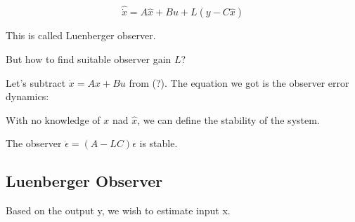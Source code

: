 \begin{equation}
    \hat \dot x = A \hat x + Bu + L(y - C \hat x) 
\end{equation}

This is called Luenberger observer.  

But how to find suitable observer gain $L$?

Let's subtract $\dot x = Ax + Bu$ from (?). The equation we got is the observer error dynamics:





With no knowledge of $x$ nad $\hat x$, we can define the stability of the system. 

The observer $\dot \epsilon = (A - LC) \epsilon$ is stable. 



\subsection{Luenberger Observer}
Based on the output y, we wish to estimate input x.